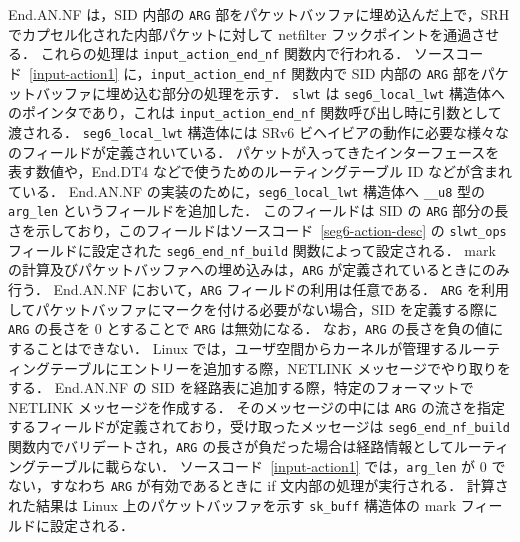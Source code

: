 End.AN.NF は，SID 内部の \texttt{ARG} 部をパケットバッファに埋め込んだ上で，SRH でカプセル化された内部パケットに対して netfilter フックポイントを通過させる．
これらの処理は \texttt{input\_action\_end\_nf} 関数内で行われる．
ソースコード~\ref*{input-action1} に，\texttt{input\_action\_end\_nf} 関数内で SID 内部の \texttt{ARG} 部をパケットバッファに埋め込む部分の処理を示す．
\texttt{slwt} は \texttt{seg6\_local\_lwt} 構造体へのポインタであり，これは \texttt{input\_action\_end\_nf} 関数呼び出し時に引数として渡される．
\texttt{seg6\_local\_lwt} 構造体には SRv6 ビヘイビアの動作に必要な様々なのフィールドが定義されいている．
パケットが入ってきたインターフェースを表す数値や，End.DT4 などで使うためのルーティングテーブル ID などが含まれている．
End.AN.NF の実装のために，\texttt{seg6\_local\_lwt} 構造体へ \texttt{\_\_u8} 型の \texttt{arg\_len} というフィールドを追加した．
このフィールドは SID の \texttt{ARG} 部分の長さを示しており，このフィールドはソースコード~\ref*{seg6-action-desc} の \texttt{slwt\_ops} フィールドに設定された \texttt{seg6\_end\_nf\_build} 関数によって設定される．
mark の計算及びパケットバッファへの埋め込みは，\texttt{ARG} が定義されているときにのみ行う．
End.AN.NF において，\texttt{ARG} フィールドの利用は任意である．
\texttt{ARG} を利用してパケットバッファにマークを付ける必要がない場合，SID を定義する際に \texttt{ARG} の長さを $0$ とすることで \texttt{ARG} は無効になる．
なお，\texttt{ARG} の長さを負の値にすることはできない．
Linux では，ユーザ空間からカーネルが管理するルーティングテーブルにエントリーを追加する際，NETLINK メッセージでやり取りをする．
End.AN.NF の SID を経路表に追加する際，特定のフォーマットで NETLINK メッセージを作成する．
そのメッセージの中には \texttt{ARG} の流さを指定するフィールドが定義されており，受け取ったメッセージは \texttt{seg6\_end\_nf\_build} 関数内でバリデートされ，\texttt{ARG} の長さが負だった場合は経路情報としてルーティングテーブルに載らない．
ソースコード~\ref*{input-action1} では，\texttt{arg\_len} が $0$ でない，すなわち \texttt{ARG} が有効であるときに if 文内部の処理が実行される．
計算された結果は Linux 上のパケットバッファを示す \texttt{sk\_buff} 構造体の mark フィールドに設定される．

